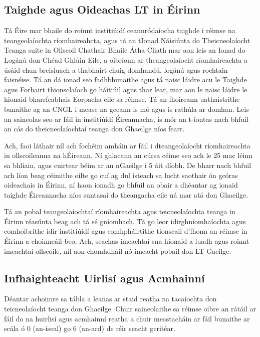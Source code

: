 \documentclass[]{../../metanetpaper}
\begin{document}
\begin{multicols}{2}
\subsection{Taighde agus Oideachas LT in Éirinn}

 Tá Éire mar bhaile do roinnt institiúidí ceannródaíocha taighde i réimse na teangeolaíochta ríomhaireahcta, agus tá an tIonad Náisiúnta do Theicneolaíocht Teanga suite in Ollscoil Chathair Bhaile Átha Cliath mar aon leis an Ionad do Logánú don Chéad Ghlúin Eile, a oibríonn ar theangeolaíocht ríomhaireachta a úsáid chun breisluach a thabhairt chuig domhandú, logánú agus rochtain faisnéise. Tá an dá ionad seo fadhbhunaithe agus tá naisc láidre acu le Taighde agus Forbairt thionsclaíoch go háitiúil agus thar lear, mar aon le naisc láidre le hionaid bharrfeabhais Eorpacha eile sa réimse. Tá an fhoireann uathaistrithe bunaithe ag an CNGL i measc na gceann is mó agus is rathúla ar domhan. Leis an saineolas seo ar fáil in institiúidí Éireannacha, is mór an t-iontas nach bhfuil an cás do theicneolaíochtaí teanga don Ghaeilge níos fearr. 

Ach, faoi láthair níl ach fochéim amháin ar fáil i dteangeolaíocht ríomhaireachta in ollscoileanna na hÉireann. Ní ghlacann an cúrsa céime seo ach le 25 mac léinn sa bhliain, agus cuirtear béim ar an nGaeilge i 5 áit díobh. De bharr nach bhfuil ach líon beag céimithe oilte go cuí ag dul isteach sa lucht saothair ón gcóras oideachais in Éirinn, ní haon ionadh go bhfuil an obair a dhéantar ag ionaid taighde Éireannacha níos suntasaí do theangacha eile ná mar atá don Ghaeilge.

Tá an pobal teangeolaíochtaí ríomhaireachta agus teicneolaíochta teanga in Éirinn réasúnta beag ach tá sé gníomhach. Tá go leor idirghníomhaíochta agus comhoibrithe idir institiúidí agus comhpháirtithe tionscail d'fhonn an réimse in Éirinn a choinneáil beo. Ach, seachas imeachtaí sna hionaid a luadh agus roinnt imeachtaí ollscoile, níl aon chomhdháil nó imeacht pobail don LT Gaeilge.


\subsection{Infhaighteacht Uirlisí agus Acmhainní}

Déantar achoimre sa tábla a leanas ar staid reatha na tacaíochta don teicneolaíocht teanga don Ghaeilge. Chuir saineolaithe sa réimse oibre an rátáil ar fáil do na huirlisí agus acmhainní reatha a chuir meastacháin ar fáil bunaithe ar scála ó 0 (an-íseal) go 6 (an-ard) de réir seacht gcritéar.


\end{multicols}
\end{document}
